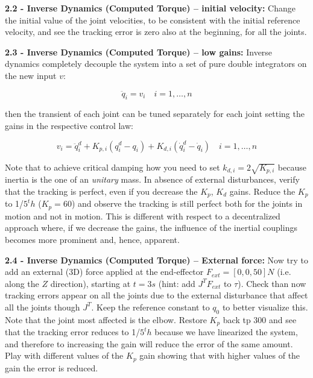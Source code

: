 \documentclass[11pt]{article}
\begin{document}
\quad

\noindent
\textbf{ 2.2 - Inverse Dynamics (Computed Torque) – initial velocity:}
Change the initial value of the joint velocities, to be consistent with the initial reference velocity, and see the tracking error is zero also at the beginning, for all the joints. 

\quad

\noindent
\textbf{ 2.3 - Inverse Dynamics (Computed Torque) – low gains:}
Inverse dynamics completely decouple the system into a set of pure double integrators on the new input $v$:

\begin{equation*}
\ddot{q}_i = v_i  \quad i = 1, \dots, n
\end{equation*}

then the transient of each joint can be tuned separately for each joint setting the gains in the respective  control law:

\begin{equation*}
v_i  = \ddot{q}^d_i + K_{p,i} (q^d_i  - q_i) + K_{d,i} (\dot{q}^d_i  - \dot{q}_i) \quad i = 1, \dots, n
\end{equation*}

Note that to achieve critical damping how you need to set $k_{d,i} = 2\sqrt{K_{p,i}}$ because inertia is the one of an \textit{unitary} mass.
In absence of external disturbances, verify that the tracking is perfect, 
even if you decrease the $K_p$, $K_d$ gains.  Reduce the $K_p$ to 1/$5^th$ ($K_p = 60$) and observe the tracking is still perfect both for the joints in motion and not in motion. This is different with respect to a decentralized approach where, if we decrease the gains,  the influence of the inertial couplings becomes more  prominent and, hence, apparent.   

\quad

\noindent
\textbf{2.4 - Inverse Dynamics (Computed Torque) – External force:} 
Now try to add an external (3D) force applied at the end-effector $F_{ext} =[0,0,50] N$ (i.e. along the $Z$ direction),
starting at $t= 3s$ (hint: add  $J^TF_{ext}$ to $\tau$). Check than now tracking errors appear on all the joints due to the external disturbance that affect all the joints though  $J^T$. Keep the  reference  constant to $q_0$ to better visualize this. Note that the joint most affected is the elbow.
Restore $K_p$ back tp $300$ and see that the tracking error reduces to 1/$5^th$ because we have linearized the system, and therefore to increasing the gain will reduce the error of the same amount. 
Play with different values of the  $K_p$ gain showing that with higher values of the gain the error is reduced.
\end{document}
